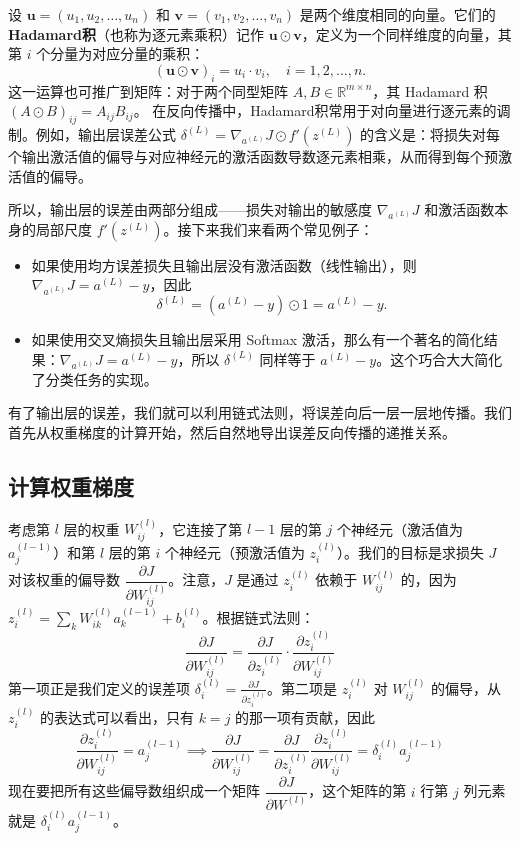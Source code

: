 \documentclass[lang=cn,zihao=-4,a4paper,fontset=windows]{beautybook}
\renewcommand{\partial}{∂}
\begin{document}
\begin{definition}
设 $\mathbf{u} = (u_1, u_2, \dots, u_n)$ 和 $\mathbf{v} = (v_1, v_2, \dots, v_n)$ 是两个维度相同的向量。它们的\textbf{Hadamard积}（也称为逐元素乘积）记作 $\mathbf{u} \odot \mathbf{v}$，定义为一个同样维度的向量，其第 $i$ 个分量为对应分量的乘积：
\[
(\mathbf{u} \odot \mathbf{v})_i = u_i \cdot v_i, \quad i = 1, 2, \dots, n.
\]
这一运算也可推广到矩阵：对于两个同型矩阵 $A, B \in \mathbb{R}^{m \times n}$，其 Hadamard 积 $(A \odot B)_{ij} = A_{ij} B_{ij}$。
在反向传播中，Hadamard积常用于对向量进行逐元素的调制。例如，输出层误差公式 $\delta^{(L)} = \nabla_{a^{(L)}} J \odot f'(z^{(L)})$ 的含义是：将损失对每个输出激活值的偏导与对应神经元的激活函数导数逐元素相乘，从而得到每个预激活值的偏导。
\end{definition}

所以，输出层的误差由两部分组成——损失对输出的敏感度 $\nabla_{a^{(L)}} J$ 和激活函数本身的局部尺度 $f'(z^{(L)})$。接下来我们来看两个常见例子：
\begin{itemize}
    \item 如果使用均方误差损失且输出层没有激活函数（线性输出），则 $\nabla_{a^{(L)}} J = a^{(L)} - y$，因此
    \[
    \delta^{(L)} = (a^{(L)} - y) \odot 1 = a^{(L)} - y.
    \]
    \item 如果使用交叉熵损失且输出层采用 Softmax 激活，那么有一个著名的简化结果：$\nabla_{a^{(L)}} J = a^{(L)} - y$，所以 $\delta^{(L)}$ 同样等于 $a^{(L)} - y$。这个巧合大大简化了分类任务的实现。
\end{itemize}

有了输出层的误差，我们就可以利用链式法则，将误差向后一层一层地传播。我们首先从权重梯度的计算开始，然后自然地导出误差反向传播的递推关系。

\subsection{计算权重梯度}
考虑第 $l$ 层的权重 $W_{ij}^{(l)}$，它连接了第 $l-1$ 层的第 $j$ 个神经元（激活值为 $a_j^{(l-1)}$）和第 $l$ 层的第 $i$ 个神经元（预激活值为 $z_i^{(l)}$）。我们的目标是求损失 $J$ 对该权重的偏导数 $\dfrac{\partial J}{\partial W_{ij}^{(l)}}$。注意，$J$ 是通过 $z_i^{(l)}$ 依赖于 $W_{ij}^{(l)}$ 的，因为 $z_i^{(l)} = \sum_k W_{ik}^{(l)} a_k^{(l-1)} + b_i^{(l)}$。根据链式法则：
\[\frac{\partial J}{\partial W_{ij}^{(l)}} = \frac{\partial J}{\partial z_i^{(l)}} \cdot \frac{\partial z_i^{(l)}}{\partial W_{ij}^{(l)}}\]
第一项正是我们定义的误差项 $\delta_i^{(l)} = \frac{\partial J}{\partial z_i^{(l)}}$。第二项是 $z_i^{(l)}$ 对 $W_{ij}^{(l)}$ 的偏导，从 $z_i^{(l)}$ 的表达式可以看出，只有 $k=j$ 的那一项有贡献，因此
\[\frac{\partial z_i^{(l)}}{\partial W_{ij}^{(l)}} = a_j^{(l-1)}\implies \frac{\partial J}{\partial W_{ij}^{(l)}} =\frac{\partial J}{\partial z_i^{(l)}}\frac{\partial z_i^{(l)}}{\partial W_{ij}^{(l)}} = \delta_i^{(l)} a_j^{(l-1)}\]
现在要把所有这些偏导数组织成一个矩阵 $\dfrac{\partial J}{\partial W^{(l)}}$，这个矩阵的第 $i$ 行第 $j$ 列元素就是 $\delta_i^{(l)} a_j^{(l-1)}$。
\end{document}
